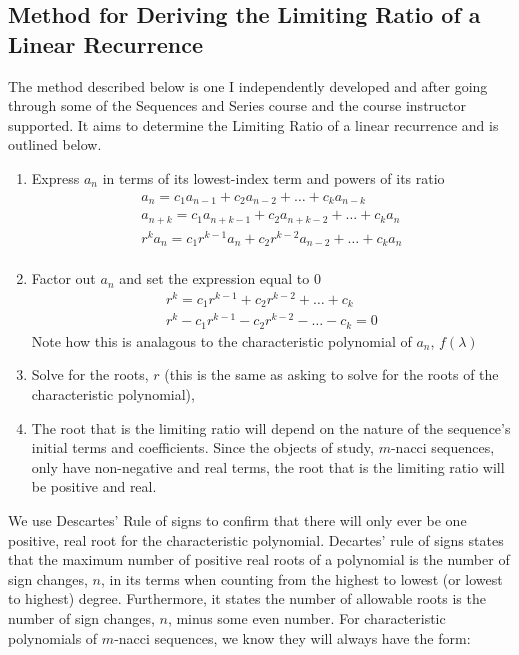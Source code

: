 \documentclass[11pt]{article}
\begin{document}
\subsection{Method for Deriving the Limiting Ratio of a Linear Recurrence}
The method described below is one I independently developed and after going through some of the Sequences and Series course and the course instructor supported. It aims to determine the Limiting Ratio of a linear recurrence and is outlined below.
\begin{enumerate}
    \item Express $a_n$ in terms of its lowest-index term and powers of its ratio 
    \begin{align*}
        a_n=c_1a_{n-1}+c_2a_{n-2}+\dots +c_ka_{n-k} \\
        a_{n+k}=c_1a_{n+k-1}+c_2a_{n+k-2}+\dots +c_ka_{n} \\
        r^{k}a_{n}=c_1r^{k-1}a_{n}+c_2r^{k-2}a_{n-2}+\dots +c_ka_{n} \\
    \end{align*}
    \item Factor out $a_n$ and set the expression equal to 0
    \begin{align*}
        r^{k}=c_1r^{k-1}+c_2r^{k-2}+\dots +c_k \\
        r^{k}-c_1r^{k-1}-c_2r^{k-2}-\dots -c_k=0
    \end{align*}
    Note how this is analagous to the characteristic polynomial of $a_n$, \(f(\lambda)\)
    \item Solve for the roots, $r$ (this is the same as asking to solve for the roots of the characteristic polynomial), 
    \item The root that is the limiting ratio will depend on the nature of the sequence's initial terms and coefficients. Since the objects of study, \(m\)-nacci sequences, only have non-negative and real terms, the root that is the limiting ratio will be positive and real. 
\end{enumerate}
We use Descartes' Rule of signs to confirm that there will only ever be one positive, real root for the characteristic polynomial. Decartes' rule of signs states that the maximum number of positive real roots of a polynomial is the number of sign changes, \(n\), in its terms when counting from the highest to lowest (or lowest to highest) degree. Furthermore, it states the number of allowable roots is the number of sign changes, \(n\), minus some even number. 
For characteristic polynomials of \(m\)-nacci sequences, we know they will always have the form: 
\end{document}
